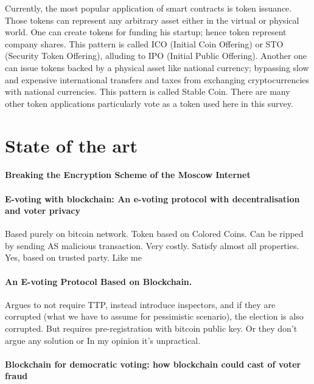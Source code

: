 \documentclass[runningheads]{llncs}
\begin{document}
Currently, the most popular application of smart contracts is token issuance. Those tokens can represent any arbitrary asset either in the virtual or physical world. One can create tokens for funding his startup; hence token represent company shares. This pattern is called ICO (Initial Coin Offering) or STO (Security Token Offering), alluding to IPO (Initial Public Offering). Another one can issue tokens backed by a physical asset like national currency; bypassing slow and expensive international transfers and taxes from exchanging cryptocurrencies with national currencies. This pattern is called Stable Coin. There are many other token applications particularly vote as a token used here in this survey.

\section{State of the art}

\paragraph{Breaking the Encryption Scheme of the Moscow Internet ~\cite{gaudry2019breaking} }

\paragraph{E-voting with blockchain: An e-voting protocol with decentralisation and voter privacy ~\cite{hardwick2018voting} }
Based purely on bitcoin network. Token based on Colored Coins. Can be ripped by sending AS malicious transaction. Very costly. Satisfy almost all properties. Yes, based on trusted party. Like me

\paragraph{An E-voting Protocol Based on Blockchain. ~\cite{liu2017voting}}
Argues to not require TTP, instead introduce inspectors, and if they are corrupted (what we have to assume for pessimistic scenario), the election is also corrupted. But requires pre-registration with bitcoin public key. Or they don't argue any solution or In my opinion it's unpractical.

\paragraph{Blockchain for democratic voting: how blockchain could cast of voter fraud ~\cite{casado2018blockchain} }
\end{document}
